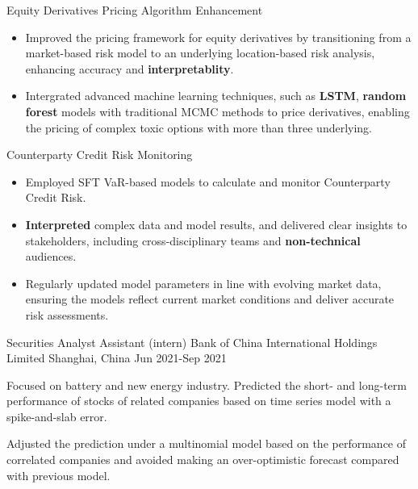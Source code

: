 \begin{cventries}
{\begin{cvitems}
    \item Equity Derivatives Pricing Algorithm Enhancement
    \begin{itemize}
      \item Improved the pricing framework for equity derivatives by transitioning from a market-based risk model to an underlying location-based risk analysis, enhancing accuracy and \textbf{interpretablity}.
      \item Intergrated advanced machine learning techniques, such as \textbf{LSTM}, \textbf{random forest} models with traditional MCMC methods to price derivatives, enabling the pricing of complex toxic options with more than three underlying.
    \end{itemize}
    \item Counterparty Credit Risk Monitoring
    \begin{itemize}
      \item Employed SFT VaR-based models to calculate and monitor Counterparty Credit Risk.
      \item \textbf{Interpreted} complex data and model results, and delivered clear insights to stakeholders, including cross-disciplinary teams and \textbf{non-technical} audiences.
      \item Regularly updated model parameters in line with evolving market data, ensuring the models reflect current market conditions and deliver accurate risk assessments.
    \end{itemize}
  \end{cvitems}
}


  \cventry
    {Securities Analyst Assistant (intern)} %
    {Bank of China International Holdings Limited} %
    {Shanghai, China} %
    {Jun 2021-Sep 2021} %
    {
      \begin{cvitems} %
        \item {Focused on battery and new energy industry. Predicted the short- and long-term performance of stocks of related companies based on time series model with a spike-and-slab error.}
        \item {Adjusted the prediction under a multinomial model based on the performance of correlated companies and avoided making an over-optimistic forecast compared with previous model.}
      \end{cvitems}
    }


\end{cventries}
